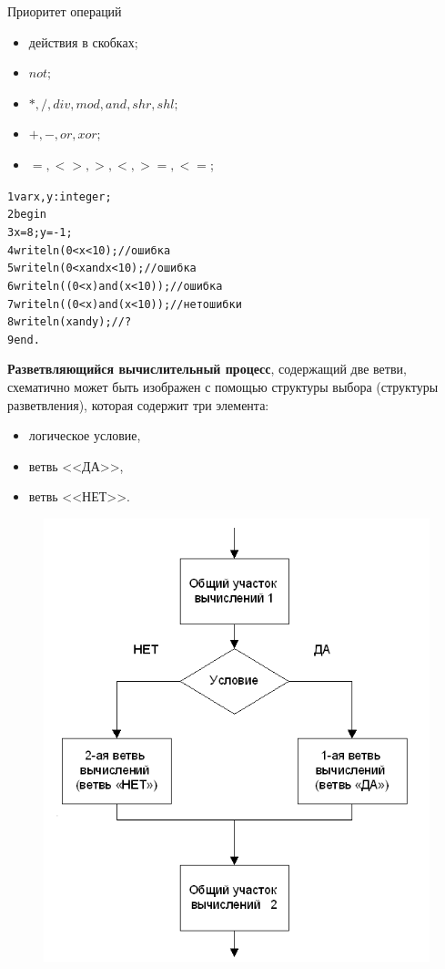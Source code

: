 \documentclass{beamer}
\begin{document}
\begin{frame}[fragile]{Приоритет операций}
\begin{itemize}
\item действия в скобках; 
\item $not;$
\item $*, /, div, mod, and, shr, shl;$
\item $+, -, or, xor;$
\item $=, <>, >, <, >=, <=$;
\end{itemize}
\begin{alltt}
1 var x, y: integer;
2 begin
3   x = 8; y = -1; 
4   writeln(0 < x < 10);            // ошибка
5   writeln(0 < x and x < 10);      // ошибка
6   writeln((0 < x) and (x < 10));  // ошибка 
7   writeln((0 < x) and (x < 10));  // нет ошибки
8   writeln(x and y);               // ?
9 end.
\end{alltt}
\end{frame}

\begin{frame}
\textbf{Разветвляющийся вычислительный процесс}, содержащий две ветви, схематично может быть изображен с помощью структуры выбора (структуры разветвления), которая содержит три элемента: 
\begin{itemize}
\item логическое условие, 
\item ветвь <<ДА>>, 
\item ветвь <<НЕТ>>.
\end{itemize}
\begin{figure}[h]
\centering
\includegraphics[scale=0.35]{images/lec03-pic03.png}
\end{figure}
\end{frame}
\end{document}
